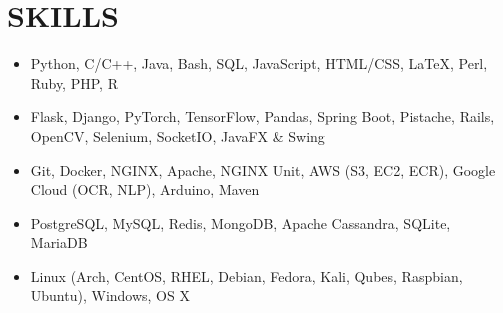 \documentclass[11pt,letterpaper]{article}
\begin{document}
  \smallskip


  \section*{SKILLS}

  \begin{itemize}
    \item{
      {}
      Python, C/C++, Java, Bash, SQL, JavaScript, HTML/CSS, \LaTeX, Perl, Ruby, PHP, R
    }

    \item{
      {}
      Flask, Django, PyTorch, TensorFlow, Pandas, Spring Boot, Pistache, Rails, OpenCV, Selenium, SocketIO, JavaFX \& Swing
    }

    \item{
      {}
      Git, Docker, NGINX, Apache, NGINX Unit, AWS (S3, EC2, ECR), Google Cloud (OCR, NLP), Arduino, Maven
    }

    \item{
      {}
      PostgreSQL, MySQL, Redis, MongoDB, Apache Cassandra, SQLite, MariaDB
    }

    \item{
      {}
      Linux (Arch, CentOS, RHEL, Debian, Fedora, Kali, Qubes, Raspbian, Ubuntu), Windows, OS X
    }
  \end{itemize}
\end{document}
